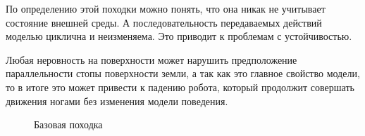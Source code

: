 По определению этой походки можно понять, что она никак не учитывает состояние внешней среды. А последовательность передаваемых действий моделью циклична и неизменяема. Это приводит к проблемам с устойчивостью.

Любая неровность на поверхности может нарушить предположение параллельности стопы поверхности земли, а так как это главное свойство модели, то в итоге это может привести к падению робота, который продолжит совершать движения ногами без изменения модели поведения.


\begin{figure}[ht]
    \caption[Базовая походка]{Базовая походка}\label{fig:base_walk_example}
\end{figure}
